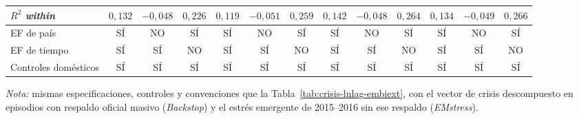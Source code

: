 \documentclass[11pt]{article}
\begin{document}
\begin{landscape}
\begin{table}
\begin{adjustbox}{max width=\linewidth, max totalheight=\tablaalto\textheight}
\begin{tabular}{l c ccc ccc ccc cc}
$R^2$ \textit{within} & $0{,}132$ & $-0{,}048$ & $0{,}226$ & $0{,}119$ & $-0{,}051$ & $0{,}259$ & $0{,}142$ & $-0{,}048$ & $0{,}264$ & $0{,}134$ & $-0{,}049$ & $0{,}266$ \\
\midrule
EF de país & SÍ & NO & SÍ & SÍ & NO & SÍ & SÍ & NO & SÍ & SÍ & NO & SÍ \\
EF de tiempo & SÍ & SÍ & NO & SÍ & SÍ & NO & SÍ & SÍ & NO & SÍ & SÍ & NO \\
Controles domésticos & SÍ & SÍ & SÍ & SÍ & SÍ & SÍ & SÍ & SÍ & SÍ & SÍ & SÍ & SÍ \\
\bottomrule
\end{tabular}
\end{adjustbox}
\par\smallskip\parbox{\linewidth}{\scriptsize \textit{Nota:} mismas especificaciones, controles y convenciones que la Tabla~\ref{tab:crisis-lnlag-embiext}, con el vector de crisis descompuesto en episodios con respaldo oficial masivo (\textit{Backstop}) y el estrés emergente de 2015--2016 sin ese respaldo (\textit{EMstress}).}
\end{table}
\end{landscape}
\end{document}
